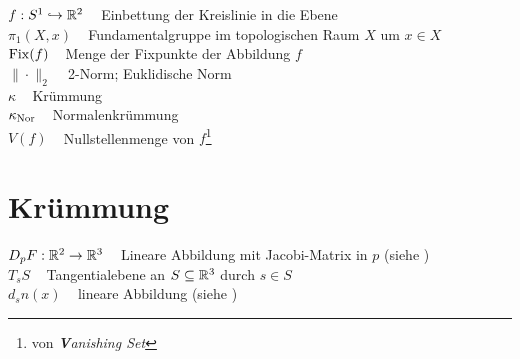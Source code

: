 $f:S^1 \hookrightarrow \mathbb{R}^2\;\;\;$ Einbettung der Kreislinie in die Ebene\\
$\pi_1(X,x)\;\;\;$ Fundamentalgruppe im topologischen Raum $X$ um $x \in X$\\
$\operatorname{Fix}(f)\;\;\;$ Menge der Fixpunkte der Abbildung $f$\\
$\|\cdot\|_2\;\;\;$ 2-Norm; Euklidische Norm\\
$\kappa\;\;\;$ Krümmung\\
$\kappa_{\textnormal{Nor}}\;\;\;$ Normalenkrümmung\\
$V(f)\;\;\;$ Nullstellenmenge von $f$\footnote{von \textit{\textbf{V}anishing Set}}

\section*{Krümmung}
$D_p F: \mathbb{R}^2 \rightarrow \mathbb{R}^3\;\;\;$ Lineare Abbildung mit Jacobi-Matrix in $p$ (siehe )\\
$T_s S\;\;\;$ Tangentialebene an $S \subseteq \mathbb{R}^3$ durch $s \in S$\\
$d_s n(x)\;\;\;$ lineare Abbildung (siehe )\\

